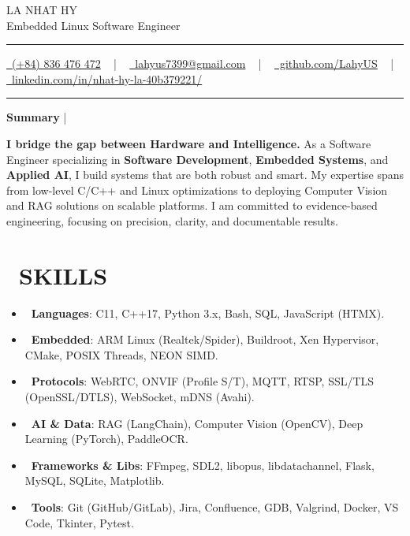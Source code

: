 \documentclass[letterpaper,10pt]{article}
\newcommand{\documentTitle}[2]{
  \begin{center}
    {\Huge\color{accentTitle} #1}
    \vspace{10pt}
    {\color{accentLine} \hrule}
    \vspace{2pt}
    \footnotesize{#2}
    \vspace{2pt}
    {\color{accentLine} \hrule}
  \end{center}
}
\newcommand{\tinysection}[1]{
  \phantomsection
  \addcontentsline{toc}{section}{#1}
  {\large{\bfseries\color{accentText}#1} {\color{accentLine} |}}
}
\begin{document}



  \documentTitle{LA NHAT HY \\ \vspace{0.5em} \large Embedded Linux Software Engineer}{
    \href{tel:0836476472}{
      \raisebox{-0.05\height} \faPhone\ (+84) 836 476 472} ~ | ~
    \href{mailto:lahyus7399@gmail.com}{
      \raisebox{-0.15\height} \faEnvelope\ lahyus7399@gmail.com} ~ | ~
    \href{https://github.com/LahyUS}{
      \raisebox{-0.15\height} \faGithub\ github.com/LahyUS}  ~ | ~
    \href{https://www.linkedin.com/in/nhat-hy-la-40b379221/}{
      \raisebox{-0.15\height} \faLinkedin\ linkedin.com/in/nhat-hy-la-40b379221/}
  }


  \tinysection{Summary}
  \textbf{I bridge the gap between Hardware and Intelligence.} As a Software Engineer specializing in \textbf{Software Development}, \textbf{Embedded Systems}, and \textbf{Applied AI}, I build systems that are both robust and smart. My expertise spans from low-level C/C++ and Linux optimizations to deploying Computer Vision and RAG solutions on scalable platforms. I am committed to evidence-based engineering, focusing on precision, clarity, and documentable results.


  \section{\faTools\ SKILLS}
 
   \begin{itemize}[itemsep=1pt, parsep=1pt, leftmargin=15pt, label={}]
     \item \textbf{\faCode\ Languages}: C11, C++17, Python 3.x, Bash, SQL, JavaScript (HTMX).
     \item \textbf{\faMicrochip\ Embedded}: ARM Linux (Realtek/Spider), Buildroot, Xen Hypervisor, CMake, POSIX Threads, NEON SIMD.
     \item \textbf{\faGlobe\ Protocols}: WebRTC, ONVIF (Profile S/T), MQTT, RTSP, SSL/TLS (OpenSSL/DTLS), WebSocket, mDNS (Avahi).
     \item \textbf{\faBrain\ AI \& Data}: RAG (LangChain), Computer Vision (OpenCV), Deep Learning (PyTorch), PaddleOCR.
     \item \textbf{\faLayerGroup\ Frameworks \& Libs}: FFmpeg, SDL2, libopus, libdatachannel, Flask, MySQL, SQLite, Matplotlib.
     \item \textbf{\faToolbox\ Tools}: Git (GitHub/GitLab), Jira, Confluence, GDB, Valgrind, Docker, VS Code, Tkinter, Pytest.
   \end{itemize}
 
\end{document}
